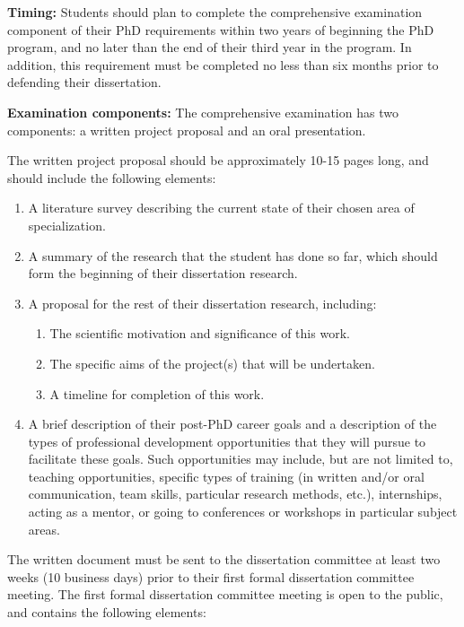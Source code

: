 \vspace{2mm}
\noindent
\textbf{Timing:} Students should plan to complete the comprehensive
examination component of their PhD requirements within two years of
beginning the PhD program, and no later than the end of their third
year in the program.  In addition, this requirement must be completed
no less than six months prior to defending their dissertation. 


\vspace{2mm}
\noindent
\textbf{Examination components:} The comprehensive examination has two components: a written project proposal and an oral presentation.

The written project proposal should be approximately 10-15 pages long, and should include the following elements:

\begin{enumerate}
\item  A literature survey describing the current state of their chosen area of specialization.
\item  A summary of the research that the student has done so far, which should form the beginning of their dissertation research.
\item  A proposal for the rest of their dissertation research, including:

\begin{enumerate}
  \item  The scientific motivation and significance of this work.
  \item  The specific aims of the project(s) that will be undertaken.
  \item  A timeline for completion of this work.
\end{enumerate}

\item  A brief description of their post-PhD career goals and a
  description of the types of professional development opportunities
  that they will pursue to facilitate these goals.  Such opportunities
  may include, but are not limited to, teaching opportunities, specific types of training (in
  written and/or oral communication, team skills, particular research
  methods, etc.), internships, acting as a mentor, or going to
  conferences or workshops in particular subject areas.

\end{enumerate}

The written document must be sent to the dissertation committee at least two
weeks (10 business days) prior to their first formal dissertation committee
meeting.  The first formal dissertation committee meeting is open to the public,
and contains the following elements:

